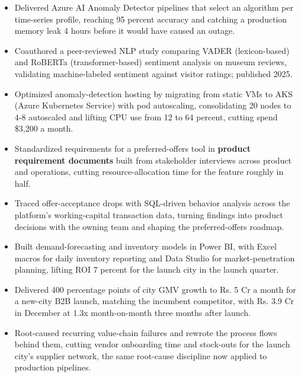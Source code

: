 \documentclass[letterpaper,10pt]{article}
\begin{document}
\begin{itemize}
\item Delivered Azure AI Anomaly Detector pipelines that select an algorithm per time-series profile, reaching 95 percent accuracy and catching a production memory leak 4 hours before it would have caused an outage.
\item Coauthored a peer-reviewed NLP study comparing VADER (lexicon-based) and RoBERTa (transformer-based) sentiment analysis on museum reviews, validating machine-labeled sentiment against visitor ratings; published 2025.
\item Optimized anomaly-detection hosting by migrating from static VMs to AKS (Azure Kubernetes Service) with pod autoscaling, consolidating 20 nodes to 4-8 autoscaled and lifting CPU use from 12 to 64 percent, cutting spend \$3,200 a month.
\end{itemize}

\begin{itemize}
\item Standardized requirements for a preferred-offers tool in \textbf{product requirement documents} built from stakeholder interviews across product and operations, cutting resource-allocation time for the feature roughly in half.
\item Traced offer-acceptance drops with SQL-driven behavior analysis across the platform's working-capital transaction data, turning findings into product decisions with the owning team and shaping the preferred-offers roadmap.
\end{itemize}


\begin{itemize}
\item Built demand-forecasting and inventory models in Power BI, with Excel macros for daily inventory reporting and Data Studio for market-penetration planning, lifting ROI 7 percent for the launch city in the launch quarter.
\item Delivered 400 percentage points of city GMV growth to Rs. 5 Cr a month for a new-city B2B launch, matching the incumbent competitor, with Rs. 3.9 Cr in December at 1.3x month-on-month three months after launch.
\item Root-caused recurring value-chain failures and rewrote the process flows behind them, cutting vendor onboarding time and stock-outs for the launch city's supplier network, the same root-cause discipline now applied to production pipelines.
\end{itemize}
\end{document}
